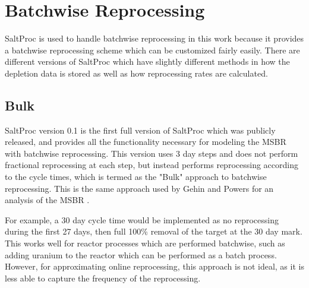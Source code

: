 
\renewcommand*\descriptionlabel[1]{\hspace\leftmargin$#1$}
\setcounter{tocdepth}{5}
\setcounter{secnumdepth}{5}
\newcommand{\minus}{\scalebox{0.65}[1.0]{$-$}}


 
 

\section{Batchwise Reprocessing}

SaltProc is used to handle batchwise reprocessing in this work because it provides a batchwise reprocessing scheme which can be customized fairly easily. There are different versions of SaltProc which have slightly different methods in how the depletion data is stored as well as how reprocessing rates are calculated.

\subsection{Bulk}

SaltProc version 0.1 is the first full version of SaltProc which was publicly released, and provides all the functionality necessary for modeling the MSBR with batchwise reprocessing. This version uses 3 day steps and does not perform fractional reprocessing at each step, but instead performs reprocessing according to the cycle times, which is termed as the "Bulk" approach to batchwise reprocessing. This is the same approach used by Gehin and Powers for an analysis of the MSBR \cite{gehin_liquid_2016}.

For example, a 30 day cycle time would be implemented as no reprocessing during the first 27 days, then full 100\% removal of the target at the 30 day mark. This works well for reactor processes which are performed batchwise, such as adding uranium to the reactor which can be performed as a batch process. However, for approximating online reprocessing, this approach is not ideal, as it is less able to capture the frequency of the reprocessing.

